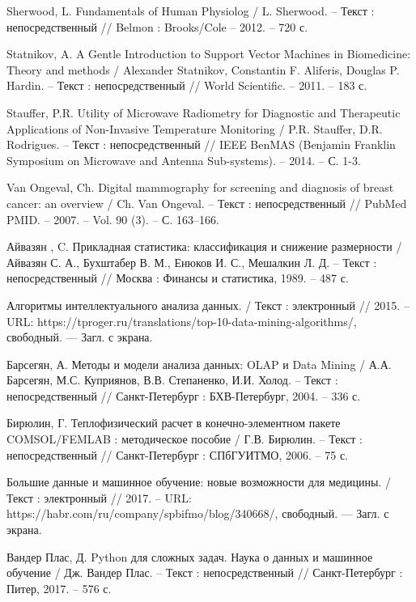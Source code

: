 \begin{thebibliography}{3}
	 Sherwood, L. Fundamentals of Human Physiolog / L. Sherwood. -- Текст : непосредственный // Belmon : Brooks/Cole -- 2012. -- 720 с.
	
	 Statnikov, A. A Gentle Introduction to Support Vector Machines in Biomedicine: Theory and methods / Alexander Statnikov, Constantin F. Aliferis, Douglas P. Hardin. -- Текст : непосредственный // World Scientific. -- 2011. -- 183 с.
	
	 Stauffer, P.R. Utility of Microwave Radiometry for Diagnostic and Therapeutic Applications of Non-Invasive Temperature Monitoring / P.R. Stauffer, D.R. Rodrigues. -- Текст : непосредственный // IEEE BenMAS (Benjamin Franklin Symposium on Microwave and Antenna Sub-systems). -- 2014. -- С. 1-3.
	
	 Van Ongeval, Ch. Digital mammography for screening and diagnosis of breast cancer:
	an overview / Ch. Van Ongeval. -- Текст : непосредственный // PubMed PMID. -- 2007. -- Vol. 90 (3). -- С. 163–166.
	
	 Айвазян , C. Прикладная статистика: классификация и снижение размерности / Айвазян С. А., Бухштабер В. М., Енюков И. С., Мешалкин Л. Д. -- Текст : непосредственный // Москва : Финансы и статистика, 1989. -- 487 с.
	
	 Алгоритмы интеллектуального анализа данных. / Текст : электронный // 2015. -- URL: https://tproger.ru/translations/top-10-data-mining-algorithms/, свободный. — Загл. с экрана.
	
	 Барсегян, А. Методы и модели анализа данных: OLAP и Data Mining / А.А. Барсегян, М.С. Куприянов, В.В. Степаненко, И.И. Холод. -- Текст : непосредственный // Санкт-Петербург : 
	БХВ-Петербург, 2004. -- 336 с.
	
	 Бирюлин, Г. Теплофизический расчет в конечно-элементном пакете COMSOL/FEMLAB :  методическое пособие / Г.В. Бирюлин. -- Текст : непосредственный // Санкт-Петербург : СПбГУИТМО, 2006. -- 75 с.
	
	 Большие данные и машинное обучение: новые возможности для медицины. / Текст : электронный // 2017. -- URL: https://habr.com/ru/company/spbifmo/blog/340668/, свободный. — Загл. с экрана.
	
	 Вандер Плас, Д. Python для сложных задач. Наука о данных и машинное обучение / Дж. Вандер Плас. -- Текст : непосредственный // Санкт-Петербург : Питер, 2017. -- 576 с.
	

\end{thebibliography}

